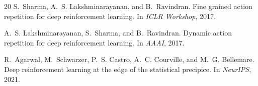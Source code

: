 \documentclass[10pt,letterpaper]{article}
\begin{document}
\begin{thebibliography}{20}
S.~Sharma, A.~S. Lakshminarayanan, and B.~Ravindran.
\newblock Fine grained action repetition for deep reinforcement learning.
\newblock In \emph{ICLR Workshop}, 2017.

A.~S. Lakshminarayanan, S.~Sharma, and B.~Ravindran.
\newblock Dynamic action repetition for deep reinforcement learning.
\newblock In \emph{AAAI}, 2017.

R.~Agarwal, M.~Schwarzer, P.~S. Castro, A.~C. Courville, and M.~G. Bellemare.
\newblock Deep reinforcement learning at the edge of the statistical precipice.
\newblock In \emph{NeurIPS}, 2021.

\end{thebibliography}
\end{document}
